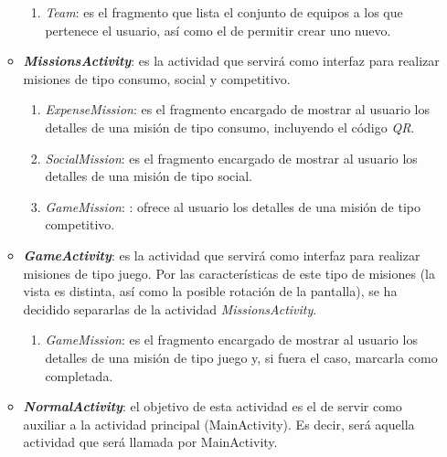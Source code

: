 \documentclass[twoside]{report}
\begin{document}
\begin{enumerate}
\begin{itemize}
\begin{enumerate}
			\item \textit{Team}: es el fragmento que lista el conjunto de equipos a los que pertenece el usuario, así como el de permitir crear uno nuevo.
		\end{enumerate}
		
	\item \textbf{\textit{MissionsActivity}}: es la actividad que servirá como interfaz para realizar misiones de tipo consumo, social y competitivo. 
	
		\begin{enumerate}
		\item \textit{ExpenseMission}: es el fragmento encargado de mostrar al usuario los detalles de una misión de tipo consumo, incluyendo el código \textit{QR}.
		
		\item \textit{SocialMission}: es el fragmento encargado de mostrar al usuario los detalles de una misión de tipo social.
		\item \textit{GameMission}: : ofrece al usuario los detalles de una misión de tipo competitivo.
		\end{enumerate}
		
	\item \textbf{\textit{GameActivity}}: es la actividad que servirá como interfaz para realizar misiones de tipo juego. Por las características de este tipo de misiones (la vista es distinta, así como la posible rotación de la pantalla), se ha decidido separarlas de la actividad \textit{MissionsActivity}.
	\begin{enumerate}
		\item \textit{GameMission}: es el fragmento encargado de mostrar al usuario los detalles de una misión de tipo juego y, si fuera el caso, marcarla como completada.
		\end{enumerate}
		
	\item \textbf{\textit{NormalActivity}}: el objetivo de esta actividad es el de servir como auxiliar a la actividad principal (MainActivity). Es decir, será aquella actividad que será llamada por MainActivity.
	

\end{itemize}
\end{enumerate}
\end{document}

